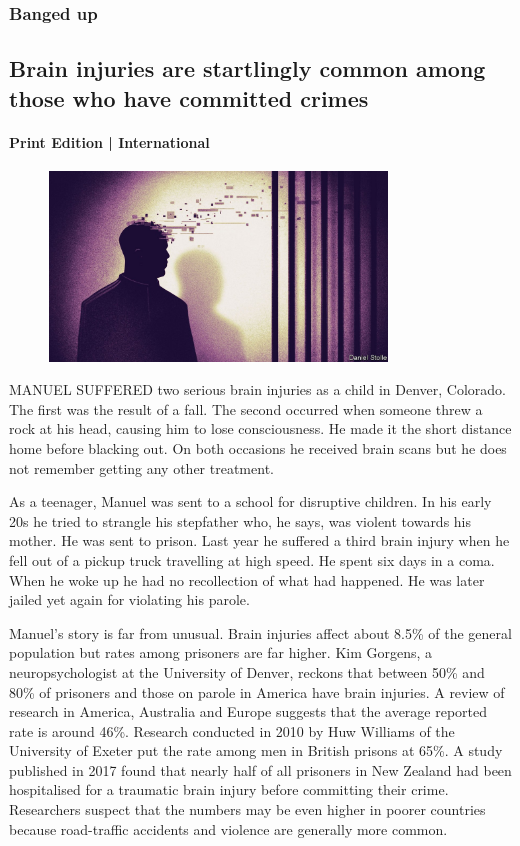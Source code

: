 \documentclass{article}
\begin{document}
\subsubsection{Banged up }
\subsection{Brain injuries are startlingly common among those who have committed crimes }
\paragraph{Print Edition | International  \quad \color{gray}{Mar 27th 2021 }}
\begin{figure}[h]
\centering
\includegraphics[width=0.8\textwidth]{images/20210327_IRD001_0.jpg}
\end{figure}
\lettrine{M}ANUEL SUFFERED two serious brain injuries as a child in Denver, Colorado. The first was the result of a fall. The second occurred when someone threw a rock at his head, causing him to lose consciousness. He made it the short distance home before blacking out. On both occasions he received brain scans but he does not remember getting any other treatment. 

As a teenager, Manuel was sent to a school for disruptive children. In his early 20s he tried to strangle his stepfather who, he says, was violent towards his mother. He was sent to prison. Last year he suffered a third brain injury when he fell out of a pickup truck travelling at high speed. He spent six days in a coma. When he woke up he had no recollection of what had happened. He was later jailed yet again for violating his parole. 

Manuel's story is far from unusual. Brain injuries affect about 8.5\% of the general population but rates among prisoners are far higher. Kim Gorgens, a neuropsychologist at the University of Denver, reckons that between 50\% and 80\% of prisoners and those on parole in America have brain injuries. A review of research in America, Australia and Europe suggests that the average reported rate is around 46\%. Research conducted in 2010 by Huw Williams of the University of Exeter put the rate among men in British prisons at 65\%. A study published in 2017 found that nearly half of all prisoners in New Zealand had been hospitalised for a traumatic brain injury before committing their crime. Researchers suspect that the numbers may be even higher in poorer countries because road-traffic accidents and violence are generally more common. 
\end{document}
